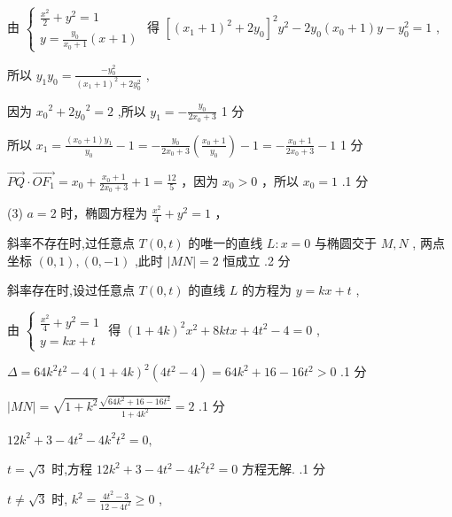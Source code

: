 \documentclass[10pt]{article}
\begin{document}
由 \(\left\{  \begin{array}{l} \frac{{x}^{2}}{2} + {y}^{2} = 1 \\  y = \frac{{y}_{0}}{{x}_{0} + 1}\left( {x + 1}\right)  \end{array}\right.\) 得 \({\left\lbrack  {\left( {x}_{1} + 1\right) }^{2} + 2{y}_{0}\right\rbrack  }^{2}{y}^{2} - 2{y}_{0}\left( {{x}_{0} + 1}\right) y - {y}_{0}^{2} = 1\) ,

所以 \({y}_{1}{y}_{0} = \frac{-{y}_{0}^{2}}{{\left( {x}_{1} + 1\right) }^{2} + 2{y}_{0}^{2}}\) ,

因为 \({x}_{0}{}^{2} + 2{y}_{0}{}^{2} = 2\) ,所以 \({y}_{1} =  - \frac{{y}_{0}}{2{x}_{0} + 3}\) 1 分

所以 \({x}_{1} = \frac{\left( {{x}_{0} + 1}\right) {y}_{1}}{{y}_{0}} - 1 =  - \frac{{y}_{0}}{2{x}_{0} + 3}\left( \frac{{x}_{0} + 1}{{y}_{0}}\right)  - 1 =  - \frac{{x}_{0} + 1}{2{x}_{0} + 3} - 1\) 1 分

\(\overrightarrow{PQ} \cdot  \overrightarrow{O{F}_{1}} = {x}_{0} + \frac{{x}_{0} + 1}{2{x}_{0} + 3} + 1 = \frac{12}{5}\) ，因为 \({x}_{0} > 0\) ，所以 \({x}_{0} = 1\) .1 分

(3) \(a = 2\) 时，椭圆方程为 \(\frac{{x}^{2}}{4} + {y}^{2} = 1\) ，

斜率不存在时,过任意点 \(T\left( {0,t}\right)\) 的唯一的直线 \(L : x = 0\) 与椭圆交于 \(M,N\) , 两点坐标 \(\left( {0,1}\right) ,\left( {0, - 1}\right)\) ,此时 \(\left| {MN}\right|  = 2\) 恒成立 .2 分

斜率存在时,设过任意点 \(T\left( {0,t}\right)\) 的直线 \(L\) 的方程为 \(y = {kx} + t\) ,

由 \(\left\{  \begin{array}{l} \frac{{x}^{2}}{4} + {y}^{2} = 1 \\  y = {kx} + t \end{array}\right.\) 得 \({\left( 1 + 4k\right) }^{2}{x}^{2} + {8ktx} + 4{t}^{2} - 4 = 0\) ,

\(\Delta  = {64}{k}^{2}{t}^{2} - 4{\left( 1 + 4k\right) }^{2}\left( {4{t}^{2} - 4}\right)  = {64}{k}^{2} + {16} - {16}{t}^{2} > 0\) .1 分

\(\left| {MN}\right|  = \sqrt{1 + {k}^{2}}\frac{\sqrt{{64}{k}^{2} + {16} - {16}{t}^{2}}}{1 + 4{k}^{2}} = 2\) .1 分

\({12}{k}^{2} + 3 - 4{t}^{2} - 4{k}^{2}{t}^{2} = 0,\)

\(t = \sqrt{3}\) 时,方程 \({12}{k}^{2} + 3 - 4{t}^{2} - 4{k}^{2}{t}^{2} = 0\) 方程无解. .1 分

\(t \neq  \sqrt{3}\) 时, \({k}^{2} = \frac{4{t}^{2} - 3}{{12} - 4{t}^{2}} \geq  0\) ,
\end{document}
